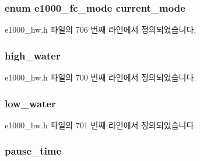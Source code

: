 \subsubsection[{\texorpdfstring{current\+\_\+mode}{current_mode}}]{\setlength{\rightskip}{0pt plus 5cm}enum {\bf e1000\+\_\+fc\+\_\+mode} current\+\_\+mode}\hypertarget{structe1000__fc__info_a7ff9ae5cd1a7fb9d4f208bd840f758f0}{}\label{structe1000__fc__info_a7ff9ae5cd1a7fb9d4f208bd840f758f0}


e1000\+\_\+hw.\+h 파일의 706 번째 라인에서 정의되었습니다.

\subsubsection[{\texorpdfstring{high\+\_\+water}{high_water}}]{ high\+\_\+water}\hypertarget{structe1000__fc__info_a0da8b901118488909e4b20caccfc6155}{}\label{structe1000__fc__info_a0da8b901118488909e4b20caccfc6155}


e1000\+\_\+hw.\+h 파일의 700 번째 라인에서 정의되었습니다.

\subsubsection[{\texorpdfstring{low\+\_\+water}{low_water}}]{ low\+\_\+water}\hypertarget{structe1000__fc__info_a2c806866e5062d3e1b1b9bad770c9f28}{}\label{structe1000__fc__info_a2c806866e5062d3e1b1b9bad770c9f28}


e1000\+\_\+hw.\+h 파일의 701 번째 라인에서 정의되었습니다.

\subsubsection[{\texorpdfstring{pause\+\_\+time}{pause_time}}]{ pause\+\_\+time}\hypertarget{structe1000__fc__info_af321c6d9439f591c76c928285f0495db}{}\label{structe1000__fc__info_af321c6d9439f591c76c928285f0495db}


